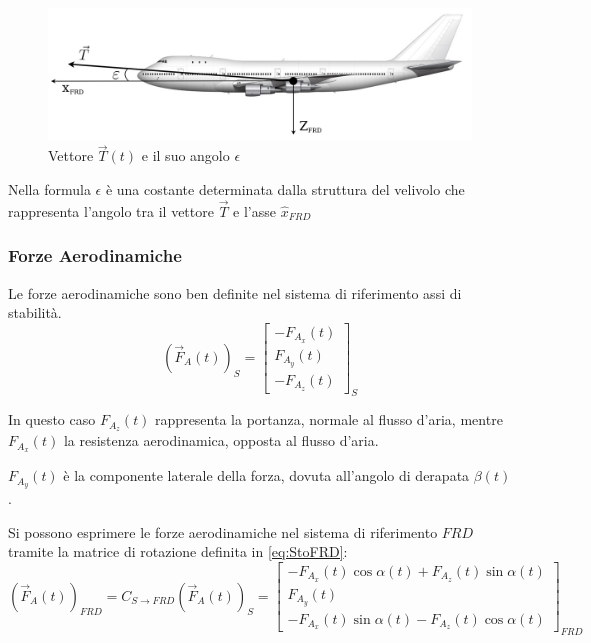 \begin{figure}[H]
    \centering
    \includegraphics[width=0.7\linewidth]{Immagini/forza_propulsiva.jpg}
    \caption{Vettore $\vec{T}(t)$ e il suo angolo $\epsilon$}
\end{figure}

\begin{note}
    Nella formula $\epsilon$ è una costante determinata dalla struttura del velivolo che rappresenta l'angolo tra il vettore $\vec{T}$ e l'asse $\hat{x}_{FRD}$
\end{note}

\subsubsection{Forze Aerodinamiche}
Le forze aerodinamiche sono ben definite nel sistema di riferimento assi di stabilità.
\begin{equation*}
    \left(\vec{F}_A(t)\right)_{S} = \begin{bmatrix}
        -F_{A_x}(t) \\
        F_{A_y}(t)  \\
        -F_{A_z}(t)
    \end{bmatrix}_{S}
\end{equation*}

In questo caso $F_{A_z}(t)$ rappresenta la portanza, normale al flusso d'aria, mentre $F_{A_x}(t)$ la resistenza aerodinamica, opposta al flusso d'aria.

$F_{A_y}(t)$ è la componente laterale della forza, dovuta all'angolo di derapata $\beta(t)$.

Si possono esprimere le forze aerodinamiche nel sistema di riferimento $FRD$ tramite la matrice di rotazione definita in \eqref{eq:StoFRD}:
\begin{equation}
    \label{eq:Faerodinamica}
    \left(\vec{F}_A(t)\right)_{FRD} = C_{S \rightarrow FRD}\left(\vec{F}_A(t)\right)_{S} = \begin{bmatrix}
        -F_{A_x}(t) \cos\alpha(t) + F_{A_z}(t) \sin\alpha(t) \\
        F_{A_y}(t)                                           \\
        -F_{A_x}(t)\sin\alpha(t) - F_{A_z}(t)\cos\alpha(t)
    \end{bmatrix}_{FRD}
\end{equation}

